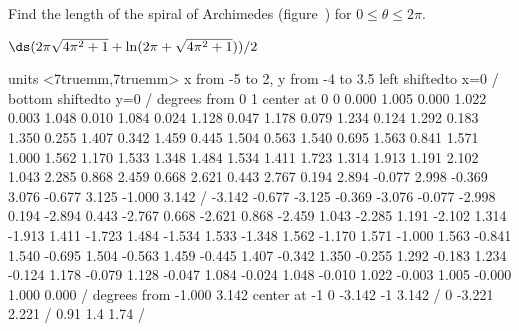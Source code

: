 \begin{exercises}
\exercise Find the length of the spiral of Archimedes
(figure~) for $0\le\theta\le2\pi$.
\begin{answer} $\ds(2\pi\sqrt{4\pi^2+1}+\ln(2\pi+\sqrt{4\pi^2+1}))/2$
\end{answer}

\figure
\vbox{\beginpicture
\normalgraphs
\sevenpoint
\setcoordinatesystem units <7truemm,7truemm>
\setplotarea x from -5 to 2, y from -4  to 3.5
\axis left shiftedto x=0 /
\axis bottom shiftedto y=0 /
 degrees from 0 1 center at 0 0
\setquadratic
\textRed
{} 0.000 1.005 0.000 1.022 0.003 1.048 0.010 1.084 0.024
1.128 0.047 1.178 0.079 1.234 0.124 1.292 0.183 1.350 0.255
1.407 0.342 1.459 0.445 1.504 0.563 1.540 0.695 1.563 0.841
1.571 1.000 1.562 1.170 1.533 1.348 1.484 1.534 1.411 1.723
1.314 1.913 1.191 2.102 1.043 2.285 0.868 2.459 0.668 2.621
0.443 2.767 0.194 2.894 -0.077 2.998 -0.369 3.076 -0.677 3.125
-1.000 3.142 /
 -3.142 -0.677 -3.125 -0.369 -3.076 -0.077 -2.998 0.194 -2.894
0.443 -2.767 0.668 -2.621 0.868 -2.459 1.043 -2.285 1.191 -2.102
1.314 -1.913 1.411 -1.723 1.484 -1.534 1.533 -1.348 1.562 -1.170
1.571 -1.000 1.563 -0.841 1.540 -0.695 1.504 -0.563 1.459 -0.445
1.407 -0.342 1.350 -0.255 1.292 -0.183 1.234 -0.124 1.178 -0.079
1.128 -0.047 1.084 -0.024 1.048 -0.010 1.022 -0.003 1.005 -0.000
1.000 0.000 /
 degrees from -1.000 3.142 center at -1 0
\textBlack
\setlinear\setdashes <2pt>
 -3.142 -1 3.142 /
 0 -3.221 2.221 /
 0.91 1.4 1.74 /
\endpicture}

\end{exercises}
